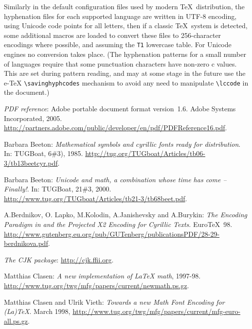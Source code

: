 \documentclass{ltxguide}[1994/11/20]
\providecommand{\Enc}[1]{\texttt{#1}}
\providecommand{\Pkg}[1]{%
  \textsf{#1}}
\begin{document}
Similarly in the default configuration files used by modern \TeX\
distribution, the hyphenation files for each supported language are
written in UTF-8 encoding, using Unicode code points for all letters,
then if a classic \TeX\ system  is detected, some additional macros are
loaded to convert these files to 256-character encodings where
possible, and assuming the \Enc{T1} lowercase table. For Unicode engines
no conversion takes place. (The hyphenation patterns for a small number of
languages require that some punctuation characters have non-zero
c values. This are set during pattern reading, and may at some
stage in the future use the e-\TeX{} \verb=\savinghyphcodes= mechanism to
avoid any need to manipulate \verb=\lccode= in the document.)




\begin{thebibliography}{99}


 \emph{\textsc{PDF} reference}:
    Adobe portable document format version~1.6.  Adobe Systems
    Incorporated, 2005. %
  \url{http://partners.adobe.com/public/developer/en/pdf/PDFReference16.pdf}.

 Barbara Beeton:
  \emph{Mathematical symbols and cyrillic fonts ready for
      distribution}.  In: TUGBoat, 6\#3), 1985.
  \url{http://tug.org/TUGboat/Articles/tb06-3/tb13beetcyr.pdf}.

 Barbara Beeton: \emph{Unicode
      and math, a combination whose time has come -- Finally!}.  In:
  TUGBoat, 21\#3, 2000.
  \url{http://www.tug.org/TUGboat/Articles/tb21-3/tb68beet.pdf}.


 A.\@ Berdnikov, O.\@
  Lapko, M.\@ Kolodin, A.\@ Janishevsky and
  A.\@ Burykin: \emph{The Encoding Paradigm in
      \LaTeXe{} and the Projected X2 Encoding for Cyrillic Texts}.
  Euro\TeX~98.
  \url{http://www.gutenberg.eu.org/pub/GUTenberg/publicationsPDF/28-29-berdnikova.pdf}.

 \emph{The \Pkg{CJK} package}:
  \url{http://cjk.ffii.org}.

 Matthias Clasen: \emph{A new
      implementation of \LaTeX{} math}, 1997-98.
  \url{http://www.tug.org/twg/mfg/papers/current/newmath.ps.gz}.

 Matthias Clasen and Ulrik
  Vieth: \emph{Towards a new Math Font Encoding
      for (La)\TeX}.  March 1998,
  \url{http://www.tug.org/twg/mfg/papers/current/mfg-euro-all.ps.gz}.


\end{thebibliography}
\end{document}
